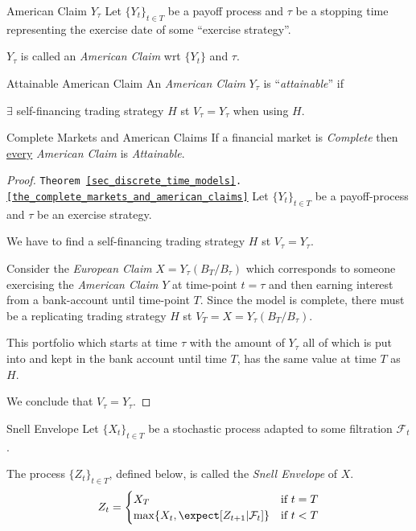 \documentclass[11pt,a4paper]{article}
\begin{document}
  \begin{definition}{American Claim $Y_\tau$}
    Let $\{Y_t\}_{t\in T}$ be a payoff process and $\tau$ be a stopping time representing the exercise date of some ``exercise strategy''.
    \par $Y_\tau$ is called an \textit{American Claim} wrt $\{Y_t\}$ and $\tau$.
  \end{definition}

  \begin{definition}{Attainable American Claim}
    An \textit{American Claim} $Y_\tau$ is ``\textit{attainable}'' if
    \begin{center}
      $\exists$ self-financing trading strategy $H$ st $V_\tau=Y_\tau$ when using $H$.
    \end{center}
  \end{definition}

  \begin{theorem}{Complete Markets and American Claims}\label{the_complete_markets_and_american_claims}
    If a financial market is \textit{Complete} then \underline{every} \textit{American Claim} is \textit{Attainable}.
  \end{theorem}

  \begin{proof}{\texttt{Theorem \ref{sec_discrete_time_models}.\ref{the_complete_markets_and_american_claims}}}
    Let $\{Y_t\}_{t\in T}$ be a payoff-process and $\tau$ be an exercise strategy.
    \par  We have to find a self-financing trading strategy $H$ st $V_\tau=Y_\tau$.
    \par Consider the \textit{European Claim} $X=Y_\tau(B_T/B_\tau)$ which corresponds to someone exercising the \textit{American Claim} $Y$ at time-point $t=\tau$ and then earning interest from a bank-account until time-point $T$. Since the model is complete, there must be a replicating trading strategy $H$ st $V_T=X=Y_\tau(B_T/B_\tau)$.
    \par This portfolio which starts at time $\tau$ with the amount of $Y_\tau$ all of which is put into and kept in the bank account until time $T$, has the same value at time $T$ as $H$.
    \par We conclude that $V_\tau=Y_\tau$.\proved
  \end{proof}

  \begin{definition}{Snell Envelope}
    Let $\{X_t\}_{t\in T}$ be a stochastic process adapted to some filtration $\mathcal{F}_t$.
    \par The process $\{Z_t\}_{t\in T}$, defined below, is called the \textit{Snell Envelope} of $X$.
    \[ Z_t=\begin{cases}
      X_T&\text{if }t=T\\
      \max\{X_t,\expect[Z_{t+1}|\mathcal{F}_t]\}&\text{if }t<T
    \end{cases} \]
  \end{definition}
\end{document}
